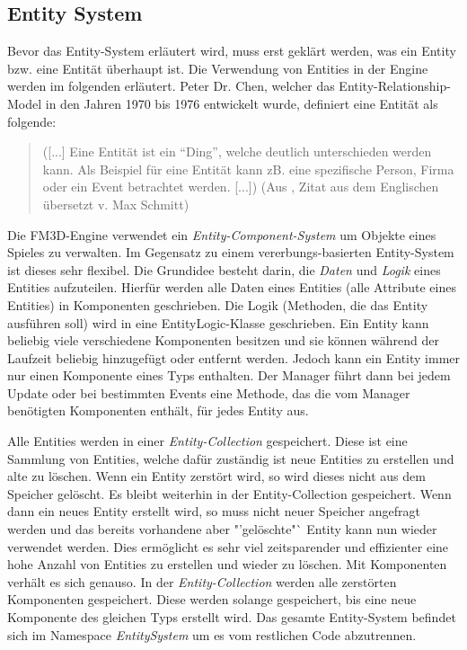 \subsection{Entity System}
\label{entitysystem}
Bevor das Entity-System erläutert wird, muss erst geklärt werden, was ein Entity bzw. eine Entität überhaupt ist. Die Verwendung von Entities in der Engine werden im folgenden erläutert.
Peter Dr. Chen, welcher das Entity-Relationship-Model in den Jahren 1970 bis 1976 entwickelt wurde, definiert eine Entität als folgende:
\begin{quote}
	([...] Eine Entität ist ein "`Ding"', welche deutlich unterschieden werden kann. Als Beispiel für eine Entität kann zB. eine spezifische Person, Firma oder ein Event betrachtet werden. [...])
	(Aus \cite{entityrelationshipmodel}, Zitat aus dem Englischen übersetzt v. Max Schmitt)
\end{quote}
Die FM3D-Engine verwendet ein \textit{Entity-Component-System} um Objekte eines Spieles zu verwalten. Im Gegensatz zu einem vererbungs-basierten Entity-System ist dieses sehr flexibel. 
Die Grundidee besteht darin, die \textit{Daten} und \textit{Logik} eines Entities aufzuteilen. Hierfür werden alle Daten eines Entities (alle Attribute eines Entities) in Komponenten geschrieben. %
Die Logik (Methoden, die das Entity ausführen soll) wird in eine EntityLogic-Klasse geschrieben. 
Ein Entity kann beliebig viele verschiedene Komponenten besitzen und sie können während der Laufzeit beliebig hinzugefügt oder entfernt werden. Jedoch kann ein Entity immer nur einen Komponente eines Typs enthalten. 
Der Manager führt dann bei jedem Update oder bei bestimmten Events eine Methode, das die vom Manager benötigten Komponenten enthält, für jedes Entity aus.

Alle Entities werden in einer \textit{Entity-Collection} gespeichert. Diese ist eine Sammlung von Entities, welche dafür zuständig ist neue Entities zu erstellen und alte zu löschen. Wenn ein Entity zerstört wird, so wird dieses nicht aus dem Speicher gelöscht. Es bleibt weiterhin in der Entity-Collection gespeichert. 
Wenn dann ein neues Entity erstellt wird, so muss nicht neuer Speicher angefragt werden und das bereits vorhandene aber "'gelöschte"` Entity kann nun wieder verwendet werden. Dies ermöglicht es sehr viel zeitsparender und effizienter eine hohe Anzahl von Entities zu erstellen und wieder zu löschen. 
Mit Komponenten verhält es sich genauso. In der \textit{Entity-Collection} werden alle zerstörten Komponenten gespeichert. Diese werden solange gespeichert, bis eine neue Komponente des gleichen Typs erstellt wird. Das gesamte Entity-System befindet sich im Namespace \textit{EntitySystem} um es vom restlichen Code abzutrennen.

